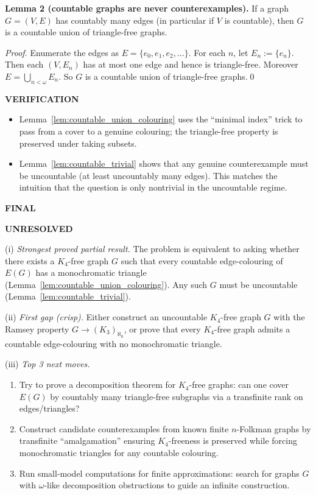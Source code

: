 \medskip
\noindent\textbf{Lemma 2 (countable graphs are never counterexamples).}\label{lem:countable_trivial}
If a graph $G=(V,E)$ has countably many edges (in particular if $V$ is countable), then $G$ is a countable union of triangle-free graphs.

\emph{Proof.}
Enumerate the edges as $E=\{e_0,e_1,e_2,\dots\}$.
For each $n$, let $E_n:=\{e_n\}$.
Then each $(V,E_n)$ has at most one edge and hence is triangle-free.
Moreover $E=\bigcup_{n<\omega} E_n$.
So $G$ is a countable union of triangle-free graphs.\qed

\bigskip
\noindent\textbf{VERIFICATION}

\begin{itemize}
\item Lemma~\ref{lem:countable_union_colouring} uses the ``minimal index'' trick to pass from a cover to a genuine colouring; the triangle-free property is preserved under taking subsets.
\item Lemma~\ref{lem:countable_trivial} shows that any genuine counterexample must be uncountable (at least uncountably many edges). This matches the intuition that the question is only nontrivial in the uncountable regime.
\end{itemize}

\bigskip
\noindent\textbf{FINAL}

\textbf{UNRESOLVED}

(i) \emph{Strongest proved partial result.}
The problem is equivalent to asking whether there exists a $K_4$-free graph $G$ such that every countable edge-colouring of $E(G)$ has a monochromatic triangle (Lemma~\ref{lem:countable_union_colouring}). Any such $G$ must be uncountable (Lemma~\ref{lem:countable_trivial}).

(ii) \emph{First gap (crisp).}
Either construct an uncountable $K_4$-free graph $G$ with the Ramsey property $G\to(K_3)_{\aleph_0}$, or prove that every $K_4$-free graph admits a countable edge-colouring with no monochromatic triangle.

(iii) \emph{Top 3 next moves.}
\begin{enumerate}
\item Try to prove a decomposition theorem for $K_4$-free graphs: can one cover $E(G)$ by countably many triangle-free subgraphs via a transfinite rank on edges/triangles?
\item Construct candidate counterexamples from known finite $n$-Folkman graphs by transfinite ``amalgamation'' ensuring $K_4$-freeness is preserved while forcing monochromatic triangles for any countable colouring.
\item Run small-model computations for finite approximations: search for graphs $G$ with $\omega$-like decomposition obstructions to guide an infinite construction.
\end{enumerate}

